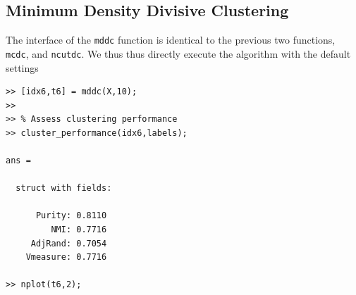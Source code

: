 \documentclass{book}
\begin{document}
\subsection{Minimum Density Divisive Clustering}

The interface of the {\tt mddc} function is identical to the previous two
functions, {\tt mcdc}, and {\tt ncutdc}. We thus thus directly execute the
algorithm with the default settings 


\begin{lstlisting}
>> [idx6,t6] = mddc(X,10);
>> 
>> % Assess clustering performance
>> cluster_performance(idx6,labels);

ans = 

  struct with fields:

      Purity: 0.8110
         NMI: 0.7716
     AdjRand: 0.7054
    Vmeasure: 0.7716

>> nplot(t6,2);
\end{lstlisting}
\end{document}
